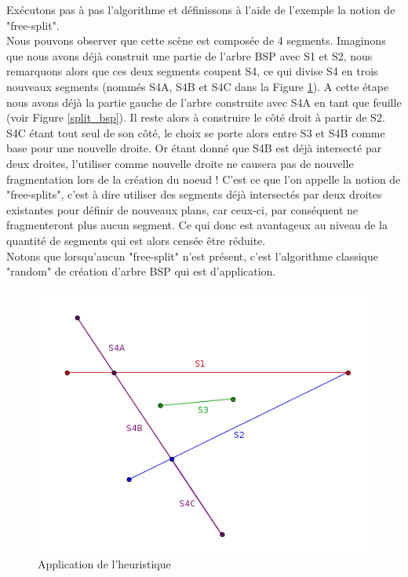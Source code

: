 \documentclass[11pt,a4paper]{article}
\begin{document}
Exécutons pas à pas l'algorithme et définissons à l'aide de l'exemple la notion de "free-split". \\

Nous pouvons observer que cette scène est composée de 4 segments. Imaginons que nous avons déjà construit une partie de l'arbre BSP avec S1 et S2, nous remarquons alors que ces deux segments coupent S4, ce qui divise S4 en trois nouveaux segments (nommés S4A, S4B et S4C dans la Figure \ref{heuristic_splits}). A cette étape nous avons déjà la partie gauche de l'arbre construite avec S4A en tant que feuille (voir Figure \ref{split_bsp}). Il reste alors à construire le côté droit à partir de S2. S4C étant tout seul de son côté, le choix se porte alors entre S3 et S4B comme base pour une nouvelle droite. Or étant donné que S4B est déjà intersecté par deux droites, l'utiliser comme nouvelle droite ne causera pas de nouvelle fragmentation lors de la création du noeud ! C'est ce que l'on appelle la notion de "free-splits", c'est à dire utiliser des segments déjà intersectés par deux droites existantes pour définir de nouveaux plans, car ceux-ci, par conséquent ne fragmenteront plus aucun segment. Ce qui donc est avantageux au niveau de la quantité de segments qui est alors censée être réduite.\\

Notons que lorsqu'aucun "free-split" n'est présent, c'est l'algorithme classique "random" de création d'arbre BSP qui est d'application. 

\begin{figure}[!h]
\centering
\includegraphics[scale=0.5]{free_splits_1.png}
\caption{Application de l'heuristique}
\label{heuristic_splits}
\end{figure}
\end{document}
